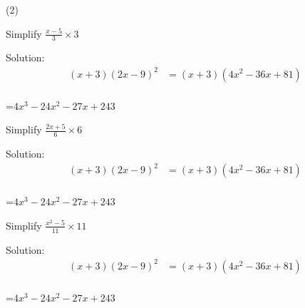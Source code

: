 \clearpage
\begin{mtask}[resume](2)
   \task \begin{exercise} Simplify $\frac{x-5}{3}\times 3$
              \begin{envSolution}
			      Solution:
			      \begin{align*}
			        (x+3)(2x-9)^2  &= (x+3)(4x^2-36x+81)                      \\[10pt]    
				 \end{align*}
                 \begin{shortsolution}  
				       =$4x^3-24x^2-27x+243$
			     \end{shortsolution}				 
               \end{envSolution}
         \end{exercise}

   \task \begin{exercise} Simplify $\frac{2x+5}{6}\times 6$
              \begin{envSolution}
			      Solution:
			      \begin{align*}
			        (x+3)(2x-9)^2  &= (x+3)(4x^2-36x+81)                      \\[10pt]    
				 \end{align*}
                 \begin{shortsolution}  
				       =$4x^3-24x^2-27x+243$
			     \end{shortsolution}				 
               \end{envSolution}
         \end{exercise}

   \task \begin{exercise} Simplify $\frac{x^2-5}{11}\times 11$
              \begin{envSolution}
			      Solution:
			      \begin{align*}
			        (x+3)(2x-9)^2  &= (x+3)(4x^2-36x+81)                      \\[10pt]    
				 \end{align*}
                 \begin{shortsolution}  
				       =$4x^3-24x^2-27x+243$
			     \end{shortsolution}				 
               \end{envSolution}
         \end{exercise}

\end{mtask}



